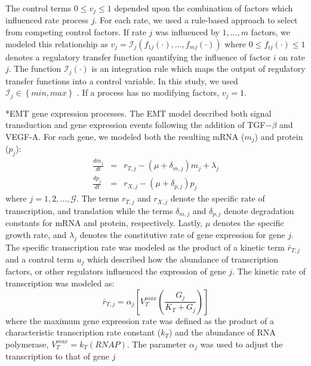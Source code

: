 \documentclass[12pt]{article}
\makeatletter
\renewcommand\subsubsection{\@startsection
	{subsubsection}{2}{0mm}
	{-0.05in}
	{-0.5\baselineskip}
	{\normalfont\normalsize\itshape}}
\makeatother
\begin{document}
The control terms $0\leq v_{j}\leq 1$ depended upon the combination of factors which influenced rate process $j$.
For each rate, we used a rule-based approach to select from competing control factors.
If rate $j$ was influenced by $1,\dots,m$ factors, we modeled this relationship as
$v_{j}=\mathcal{I}_{j}\left(f_{1j}\left(\cdot\right),\hdots,f_{mj}\left(\cdot\right)\right)$
where $0\leq f_{ij}\left(\cdot\right)\leq 1$ denotes a regulatory transfer function quantifying the influence of factor $i$ on rate $j$.
The function $\mathcal{I}_{j}\left(\cdot\right)$ is an integration rule which maps the output of regulatory transfer functions into a control
variable. In this study, we used $\mathcal{I}_{j}\in\left\{min,max\right\}$ \citep{pr3010178}. If a process has no modifying factors, $v_{j}=1$.

\subsubsection*{EMT gene expression processes.}
The EMT model described both signal transduction and gene expression events following the addition of TGF$-\beta$ and VEGF-A.
For each gene, we modeled both the resulting mRNA ($m_{j}$) and protein ($p_{j}$):
\begin{eqnarray}
	\frac{dm_{j}}{dt} &=& r_{T,j} - \left(\mu+\delta_{m,j}\right)m_{j}+\lambda_{j}\\
	\frac{dp_{j}}{dt} &=& r_{X,j} - \left(\mu+\delta_{p,j}\right)p_{j}
\end{eqnarray}where $j=1,2,\dots,\mathcal{G}$.
The terms $r_{T,j}$ and $r_{X,j}$ denote the specific rate of transcription, and translation while
the terms $\delta_{m,j}$ and $\delta_{p,j}$ denote degradation constants for mRNA and protein, respectively.
Lastly, $\mu$ denotes the specific growth rate, and $\lambda_{j}$ denotes the constitutive rate of gene expression for gene $j$.
The specific transcription rate was modeled as the product of a kinetic term $\bar{r}_{T,j}$ and a control term $u_{j}$ which described how the
abundance of transcription factors, or other regulators influenced the expression of gene $j$. The kinetic rate of transcription was modeled as:
\begin{equation}
	\bar{r}_{T,j} = \alpha_{j}\left[V^{max}_{T}\left(\frac{G_{j}}{K_{T}+G_{j}}\right)\right]
\end{equation}where the maximum gene expression rate was defined as the product of a characteristic transcription rate constant ($k_{T}$)
and the abundance of RNA polymerase, $V^{max}_{T} = k_{T}\left(RNAP\right)$. The parameter $\alpha_{j}$ was used to adjust the transcription to that of gene $j$
\end{document}
